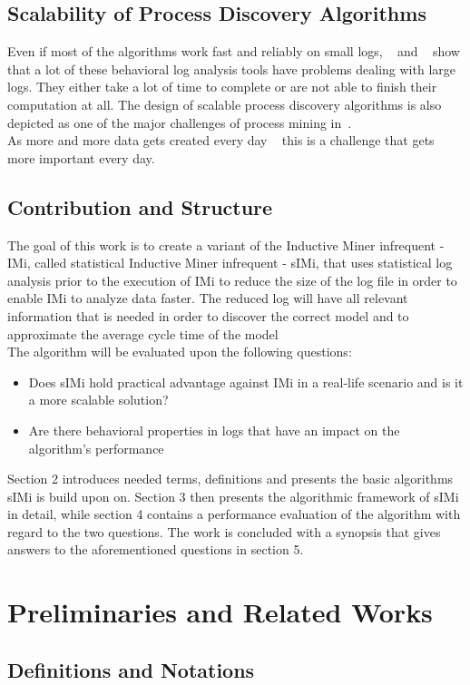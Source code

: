 \documentclass[
	a4paper,
	pagesize,
	pdftex,
	12pt,
	twoside, %
	BCOR=5mm, %
	ngerman,
	fleqn,
	final,
	]{scrartcl}
\begin{document}
\subsection{Scalability of Process Discovery Algorithms}
Even if most of the algorithms work fast and reliably on small logs, ~\cite{MapReduce} and ~\cite{ScalableDiscovery} show that a lot of these behavioral log analysis tools have problems dealing with large logs. They either take a lot of time to complete or are not able to finish their computation at all.
The design of scalable process discovery algorithms is also depicted as one of the major challenges of process mining in~\cite{ProcessMiningManifesto}.\\ As more and more data gets created every day ~\cite{Audit} this is a challenge that gets more important every day.
\subsection{Contribution and Structure}
The goal of this work is to create a variant of the Inductive Miner infrequent - IMi, called statistical Inductive Miner infrequent - sIMi, that uses statistical log analysis prior to the execution of IMi to reduce the size of the log file in order to enable IMi to analyze data faster. The reduced log will have all relevant information that is needed in order to discover the correct model and to approximate the average cycle time of the model\\ The algorithm will be evaluated upon the following questions:
\begin{itemize}
\item Does sIMi hold practical advantage against IMi in a real-life scenario and is it a more scalable solution?
\item Are there behavioral properties in logs that have an impact on the algorithm's performance
\end{itemize}
Section 2 introduces needed terms, definitions and presents the basic algorithms sIMi is build upon on. Section 3 then presents the algorithmic framework of sIMi in detail, while section 4 contains a performance evaluation of the algorithm with regard to the two questions. The work is concluded with a synopsis that gives answers to the aforementioned questions in section 5.
\section{Preliminaries and Related Works}
\subsection{Definitions and Notations}
\end{document}
